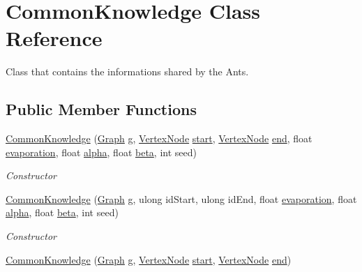 \hypertarget{classCommonKnowledge}{}\section{Common\+Knowledge Class Reference}
\label{classCommonKnowledge}


Class that contains the informations shared by the Ants.  


\subsection*{Public Member Functions}
\begin{DoxyCompactItemize}
\item 
\hyperlink{classCommonKnowledge_a19b7dc1389bd6e507e8b7517f2b4ac44}{Common\+Knowledge} (\hyperlink{classGraph}{Graph} \hyperlink{classCommonKnowledge_afe6268d0091d9477d594b7207a9b0d8b}{g}, \hyperlink{classVertexNode}{Vertex\+Node} \hyperlink{classCommonKnowledge_a968607c5b3027dc7db9178375a2071f2}{start}, \hyperlink{classVertexNode}{Vertex\+Node} \hyperlink{classCommonKnowledge_a32a5f87ad72c95bbe3e3aabca913a5a6}{end}, float \hyperlink{classCommonKnowledge_ac477ae6e96dd6685bc1c4e977d3ad2b5}{evaporation}, float \hyperlink{classCommonKnowledge_a3a7589d86c441388b36cd87a92857a53}{alpha}, float \hyperlink{classCommonKnowledge_a08c6533f6981349a857792f8baecfc32}{beta}, int seed)
\begin{DoxyCompactList}\small\item\em Constructor \end{DoxyCompactList}\item 
\hyperlink{classCommonKnowledge_a8715c63c9a71e9f83c4e101ece4f096f}{Common\+Knowledge} (\hyperlink{classGraph}{Graph} \hyperlink{classCommonKnowledge_afe6268d0091d9477d594b7207a9b0d8b}{g}, ulong id\+Start, ulong id\+End, float \hyperlink{classCommonKnowledge_ac477ae6e96dd6685bc1c4e977d3ad2b5}{evaporation}, float \hyperlink{classCommonKnowledge_a3a7589d86c441388b36cd87a92857a53}{alpha}, float \hyperlink{classCommonKnowledge_a08c6533f6981349a857792f8baecfc32}{beta}, int seed)
\begin{DoxyCompactList}\small\item\em Constructor \end{DoxyCompactList}\item 
\hyperlink{classCommonKnowledge_a0c6b70bc64936bbba283b82fbe802017}{Common\+Knowledge} (\hyperlink{classGraph}{Graph} \hyperlink{classCommonKnowledge_afe6268d0091d9477d594b7207a9b0d8b}{g}, \hyperlink{classVertexNode}{Vertex\+Node} \hyperlink{classCommonKnowledge_a968607c5b3027dc7db9178375a2071f2}{start}, \hyperlink{classVertexNode}{Vertex\+Node} \hyperlink{classCommonKnowledge_a32a5f87ad72c95bbe3e3aabca913a5a6}{end})

\end{DoxyCompactItemize}
